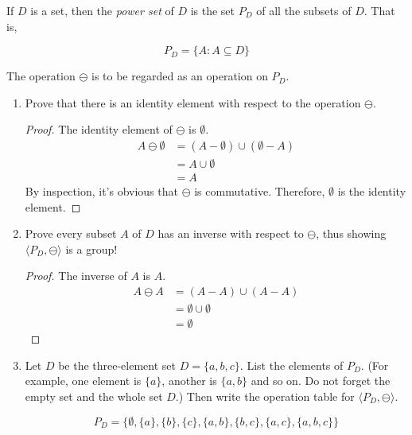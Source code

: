\documentclass[twoside]{amsart}
\begin{document}
\begin{enumerate}[A.]
   If $D$ is a set, then the \emph{power set} of $D$ is the set $P_D$
   of all the subsets of $D$. That is,
   \begin{center}
   $$ P_D = \{ A : A \subseteq D \} $$
   \end{center}

   The operation $\ominus$ is to be regarded as an operation on $P_D$.

   \begin{enumerate}[1.]

   \item Prove that there is an identity element with respect to the operation
   $\ominus$. 

   \begin{proof}
   The identity element of $\ominus$ is $\emptyset$. 
   \begin{align*}
      A \ominus \emptyset & = (A - \emptyset) \cup (\emptyset - A) \\
                          & = A \cup \emptyset \\
			  & = A
   \end{align*}
   By inspection, it's obvious that $\ominus$ is commutative. Therefore,
   $\emptyset$ is the identity element.
   \end{proof}

   \item Prove every subset $A$ of $D$ has an inverse with respect to 
   $\ominus$, thus showing $\langle P_D,\ominus \rangle$ is a group!

   \begin{proof}
      The inverse of $A$ is $A$.
      \begin{align*}
         A \ominus A & = (A - A) \cup (A - A) \\
	             & = \emptyset \cup \emptyset \\
		     & = \emptyset
      \end{align*}
   \end{proof}

   \item Let $D$ be the three-element set $D = \{a,b,c\}$. List the elements
   of $P_D$. (For example, one element is $\{a\}$, another is $\{a,b\}$ and 
   so on. Do not forget the empty set and the whole set $D$.) Then
   write the operation table for $\langle P_D,\ominus \rangle$.

   \begin{center}
      $$ P_D = \{ \emptyset, \{a\}, \{b\}, \{c\}, \{a,b\}, \{b,c\}, 
                  \{a,c\}, \{a,b,c\} \} $$
   \end{center}


\end{enumerate}
\end{enumerate}
\end{document}
